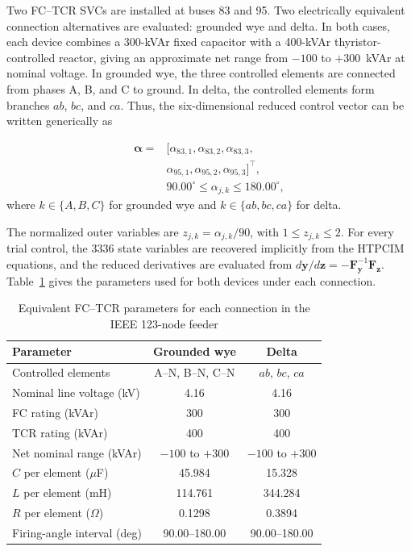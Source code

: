\documentclass[journal]{IEEEtran}
\begin{document}
Two FC--TCR SVCs are installed at buses 83 and 95. Two electrically equivalent
connection alternatives are evaluated: grounded wye and delta. In both cases,
each device combines a 300-kVAr fixed capacitor with a 400-kVAr
thyristor-controlled reactor, giving an approximate net range from $-100$ to
$+300$~kVAr at nominal voltage. In grounded wye, the three controlled elements
are connected from phases A, B, and C to ground. In delta, the controlled
elements form branches $ab$, $bc$, and $ca$. Thus, the six-dimensional reduced
control vector can be written generically as

\begin{equation}
 \begin{aligned}
 \bm{\alpha}={}&[\alpha_{83,1},\alpha_{83,2},\alpha_{83,3},\\
 &\alpha_{95,1},\alpha_{95,2},\alpha_{95,3}]^{\top},\\
 &90.00^\circ\leq\alpha_{j,k}\leq180.00^\circ,
 \end{aligned}
 \label{eq:ieee123_control_vector}
\end{equation}
where $k\in\{A,B,C\}$ for grounded wye and
$k\in\{ab,bc,ca\}$ for delta.

The normalized outer variables are $z_{j,k}=\alpha_{j,k}/90$, with
$1\leq z_{j,k}\leq2$. For every trial control, the 3336 state variables
are recovered implicitly from the HTPCIM equations, and the reduced
derivatives are evaluated from
$d\bm{y}/d\bm{z}=-\bm{F}_{\bm{y}}^{-1}\bm{F}_{\bm{z}}$.
Table~\ref{tab:svc_parameters123_current} gives the parameters used for both
devices under each connection.

\begin{table}[!t]
\centering
\caption{Equivalent FC--TCR parameters for each connection in the IEEE 123-node feeder}
\label{tab:svc_parameters123_current}
\setlength{\tabcolsep}{4pt}
\renewcommand{\arraystretch}{1.08}
\begin{tabular}{@{}lcc@{}}
\toprule
Parameter & Grounded wye & Delta \\
\midrule
Controlled elements & A--N, B--N, C--N & $ab$, $bc$, $ca$ \\
Nominal line voltage (kV) & 4.16 & 4.16 \\
FC rating (kVAr) & 300 & 300 \\
TCR rating (kVAr) & 400 & 400 \\
Net nominal range (kVAr) & $-100$ to $+300$ & $-100$ to $+300$ \\
$C$ per element ($\mu$F) & 45.984 & 15.328 \\
$L$ per element (mH) & 114.761 & 344.284 \\
$R$ per element ($\Omega$) & 0.1298 & 0.3894 \\
Firing-angle interval (deg) & 90.00--180.00 & 90.00--180.00 \\
\bottomrule
\end{tabular}
\end{table}
\end{document}

